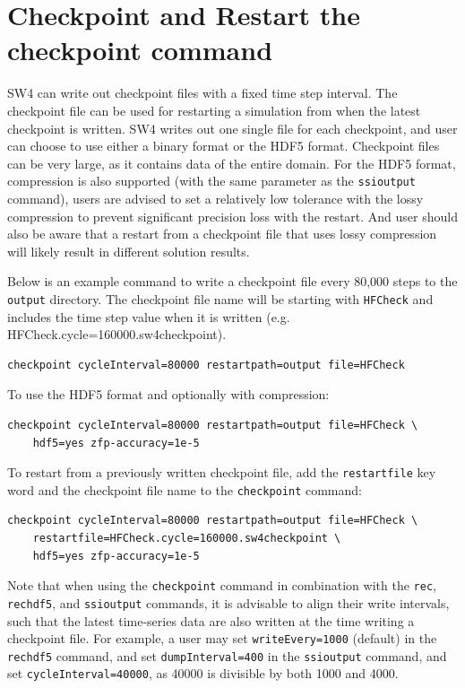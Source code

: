 \documentclass[11pt]{report}
\begin{document}
{%
\section{Checkpoint and Restart the checkpoint command}\label{sec:checkpoint}
SW4 can write out checkpoint files with a fixed time step interval. The checkpoint file can be used for restarting a simulation from when the latest checkpoint is written. SW4 writes out one single file for each checkpoint, and user can choose to use either a binary format or the HDF5 format. Checkpoint files can be very large, as it contains data of the entire domain. For the HDF5 format, compression is also supported (with the same parameter as the \verb+ssioutput+ command), users are advised to set a relatively low tolerance with the lossy compression to prevent significant precision loss with the restart. And user should also be aware that a restart from a checkpoint file that uses lossy compression will likely result in different solution results.

Below is an example command to write a checkpoint file every 80,000 steps to the \verb+output+ directory. The checkpoint file name will be starting with \verb+HFCheck+ and includes the time step value when it is written (e.g. HFCheck.cycle=160000.sw4checkpoint).
\begin{verbatim}
checkpoint cycleInterval=80000 restartpath=output file=HFCheck
\end{verbatim}
To use the HDF5 format and optionally with compression:
\begin{verbatim}
checkpoint cycleInterval=80000 restartpath=output file=HFCheck \
    hdf5=yes zfp-accuracy=1e-5
\end{verbatim}

To restart from a previously written checkpoint file, add the \verb+restartfile+ key word and the checkpoint file name to the \verb+checkpoint+ command:
\begin{verbatim}
checkpoint cycleInterval=80000 restartpath=output file=HFCheck \
    restartfile=HFCheck.cycle=160000.sw4checkpoint \
    hdf5=yes zfp-accuracy=1e-5
\end{verbatim}

Note that when using the \verb+checkpoint+ command in combination with the \verb+rec+, \verb+rechdf5+, and  \verb+ssioutput+ commands, it is advisable to align their write intervals, such that the latest time-series data are also written at the time writing a checkpoint file. For example, a user may set  \verb+writeEvery=1000+ (default) in the \verb+rechdf5+ command, and set \verb+dumpInterval=400+ in the \verb+ssioutput+ command, and set \verb+cycleInterval=40000+, as 40000 is divisible by both 1000 and 4000.

}
\end{document}
